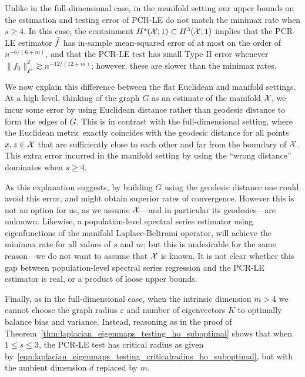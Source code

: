 Unlike in the full-dimensional case, in the manifold setting our upper bounds on the estimation and testing error of PCR-LE do not match the minimax rate when $s \geq 4$.  In this case, the containment $H^s(\mathcal{X};1) \subset H^{3}(\mathcal{X};1)$ implies that the PCR-LE estimator $\widehat{f}$ has in-sample mean-squared error of at most on the order of $n^{-6/(6 + m)}$, and that the PCR-LE test has small Type II error whenever $\|f_0\|_P^2 \gtrsim n^{-12/(12 + m)}$; however, these are slower than the minimax rates. 

We now explain this difference between the flat Euclidean and manifold settings. At a high level, thinking of the graph $G$ as an estimate of the manifold $\mathcal{X}$, we incur some error by using Euclidean distance rather than geodesic distance to form the edges of $G$. This is in contrast with the full-dimensional setting, where the Euclidean metric exactly coincides with the geodesic distance for all points $x,z \in \mathcal{X}$ that are sufficiently close to each other and far from the boundary of $\mathcal{X}$. This extra error incurred in the manifold setting by using the ``wrong distance'' dominates when $s \geq 4$. 

As this explanation suggests, by building $G$ using the geodesic distance one could avoid this error, and might obtain superior rates of convergence. However this is not an option for us, as we assume $\mathcal{X}$---and in particular its geodesics---are unknown. Likewise, a population-level spectral series estimator using eigenfunctions of the manifold Laplace-Beltrami operator, will achieve the minimax rate for all values of $s$ and $m$; but this is undesirable for the same reason---we do not want to assume that $\mathcal{X}$ is known. It is not clear whether this gap between population-level spectral series regression and the PCR-LE estimator is real, or a product of loose upper bounds. 

Finally, as in the full-dimensional case, when the intrinsic dimension $m > 4$ we cannot choose the graph radius $\varepsilon$ and number of eigenvectors $K$ to optimally balance bias and variance.  Instead, reasoning as in the proof of Theorem~\ref{thm:laplacian_eigenmaps_testing_ho_suboptimal} shows that when $1 \leq s \leq 3$, the PCR-LE test has critical radius as given by~\eqref{eqn:laplacian_eigenmaps_testing_criticalradius_ho_suboptimal}, but with the ambient dimension $d$ replaced by $m$.

